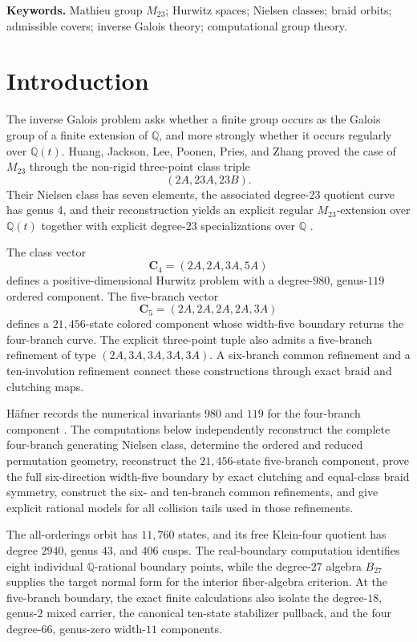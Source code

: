 \documentclass[11pt]{article}
\theoremstyle{remark}
\newcommand{\Q}{\mathbb Q}
\begin{document}
\noindent\textbf{Keywords.} Mathieu group $M_{23}$; Hurwitz spaces; Nielsen classes; braid orbits; admissible covers; inverse Galois theory; computational group theory.

\section{Introduction}

The inverse Galois problem asks whether a finite group occurs as the Galois group of a finite extension of $\Q$, and more strongly whether it occurs regularly over $\Q(t)$.  Huang, Jackson, Lee, Poonen, Pries, and Zhang proved the case of $M_{23}$ through the non-rigid three-point class triple
\[
 (2A,23A,23B).
\]
Their Nielsen class has seven elements, the associated degree-$23$ quotient curve has genus $4$, and their reconstruction yields an explicit regular $M_{23}$-extension over $\Q(t)$ together with explicit degree-$23$ specializations over $\Q$ \cite{HuangEtAl}.

The class vector
\[
 \mathbf C_4=(2A,2A,3A,5A)
\]
defines a positive-dimensional Hurwitz problem with a degree-$980$, genus-$119$ ordered component.  The five-branch vector
\[
 \mathbf C_5=(2A,2A,2A,2A,3A)
\]
defines a $21{,}456$-state colored component whose width-five boundary returns the four-branch curve.  The explicit three-point tuple also admits a five-branch refinement of type $(2A,3A,3A,3A,3A)$.  A six-branch common refinement and a ten-involution refinement connect these constructions through exact braid and clutching maps.

H\"afner records the numerical invariants $980$ and $119$ for the four-branch component \cite{Haefner}.  The computations below independently reconstruct the complete four-branch generating Nielsen class, determine the ordered and reduced permutation geometry, reconstruct the $21{,}456$-state five-branch component, prove the full six-direction width-five boundary by exact clutching and equal-class braid symmetry, construct the six- and ten-branch common refinements, and give explicit rational models for all collision tails used in those refinements.

The all-orderings orbit has $11{,}760$ states, and its free Klein-four quotient has degree $2940$, genus $43$, and $406$ cusps.  The real-boundary computation identifies eight individual $\Q$-rational boundary points, while the degree-$27$ algebra $B_{27}$ supplies the target normal form for the interior fiber-algebra criterion.  At the five-branch boundary, the exact finite calculations also isolate the degree-$18$, genus-$2$ mixed carrier, the canonical ten-state stabilizer pullback, and the four degree-$66$, genus-zero width-$11$ components.
\end{document}
